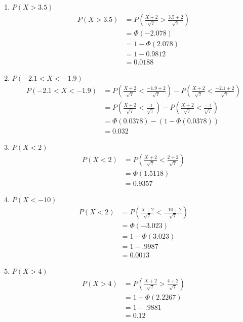 \documentclass[10pt]{article}
\begin{document}
\begin{itemize}
    \begin{enumerate}
      \item  $P\left(X>3.5\right)$
        \begin{align*}
          P\left(X > 3.5\right) &= P\left(\frac{X+2}{\sqrt{7}}  > \frac{3.5+2}{\sqrt{7}}\right)\\
            &=  \Phi\left(-2.078\right) \\
            &=  1- \Phi\left(2.078\right) \\
            &=  1- 0.9812 \\
            &=  0.0188
        \end{align*}
      \item  $P\left(-2.1<X<-1.9\right)$
        \begin{align*}
          P\left(-2.1<  X < -1.9\right) &= P\left(\frac{X+2}{\sqrt{7}}  < \frac{-1.9+2}{\sqrt{7}}\right) - P\left(\frac{X+2}{\sqrt{7}}  < \frac{-2.1+2}{\sqrt{7}}\right)\\
            &=  P\left(\frac{X+2}{\sqrt{7}}  < \frac{.1}{\sqrt{7}}\right) - P\left(\frac{X+2}{\sqrt{7}}  < \frac{-.1}{\sqrt{7}}\right)\\
            &=  \Phi\left(0.0378\right) - \left(1 - \Phi\left(0.0378\right) \right) \\
            &=  0.032
        \end{align*}

      \item  $P\left(X<2\right)$
        \begin{align*}
          P\left(X < 2\right) &= P\left(\frac{X+2}{\sqrt{7}}  < \frac{2+2}{\sqrt{7}}\right)\\
            &=  \Phi\left(1.5118\right) \\
            &=  0.9357
        \end{align*}

      \item  $P\left(X<-10\right)$
        \begin{align*}
          P\left(X < 2\right) &= P\left(\frac{X+2}{\sqrt{7}}  < \frac{-10+2}{\sqrt{7}}\right)\\
            &=  \Phi\left(-3.023\right) \\
            &=  1- \Phi\left(3.023\right) \\
            &=  1 - .9987 \\
            &= 0.0013
        \end{align*}

      \item  $P\left(X>4\right)$
        \begin{align*}
          P\left(X > 4\right) &= P\left(\frac{X+2}{\sqrt{7}}  > \frac{4+2}{\sqrt{7}}\right)\\
            &=  1- \Phi\left(2.2267\right) \\
            &=  1 - .9881 \\
            &= 0.12
        \end{align*}
    \end{enumerate}



\end{itemize}
\end{document}

